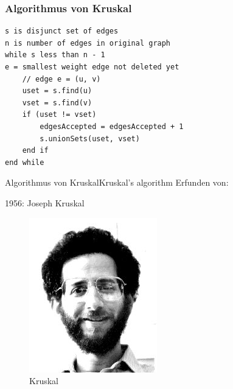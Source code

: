 \begin{frame}[fragile]
\frametitle{Algorithmus von Kruskal}
\begin{lstlisting}
s is disjunct set of edges
n is number of edges in original graph
while s less than n - 1
e = smallest weight edge not deleted yet
    // edge e = (u, v)
    uset = s.find(u)
    vset = s.find(v)
    if (uset != vset)
        edgesAccepted = edgesAccepted + 1
        s.unionSets(uset, vset)
    end if
end while
\end{lstlisting}
\end{frame}

\begin{frame}{Algorithmus von Kruskal}{Kruskal's algorithm}
	Erfunden von:

	1956: Joseph Kruskal

	\begin{figure}
		\includegraphics[scale=0.6]{Material/kruskal.jpg}
		\caption{Kruskal}
	\end{figure}
\end{frame}
